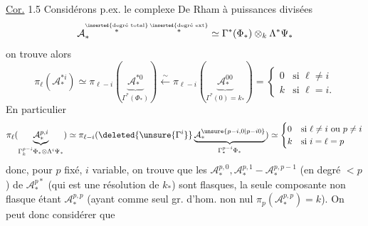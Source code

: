 \uline{Cor.} 1.5
Considérons p.ex. le complexe 
De Rham à puissances divisées
\[
\mathcal A_*^{\overset{\inserted{\text{degré total}}}{*}\,\overset{\inserted{\text{degré ext}}}{*}}
\simeq\Gamma^*(\Phi_*)\otimes_k\Lambda^*\Psi_*
\]
on trouve alors
\[
\pi_\ell(\mathcal A_*^{*i})\simeq
\pi_{\ell-i}(\underbrace{\mathcal A_*^{*0}}_{\Gamma^*(\Phi_*)})
\xleftarrow{\sim}\pi_{\ell-i}(\underbrace{\mathcal A_*^{00}}_{\Gamma^*(0)=k_*})
=\begin{cases}0&\text{si }\ell\ne i\\k&\text{si }\ell=i.\end{cases}
\]
En  particulier
\[
\pi_\ell(\underbrace{\mathcal A_*^{p,i}}_{\Gamma_k^{p-i}\Phi_*\otimes\Lambda^i\Psi_*})
\simeq\pi_{\ell-i}(\deleted{\unsure{\Gamma^i}}
\underbrace{\mathcal A_*^{\unsure{p-i,0|p-i0}}}_{\Gamma_*^{p-i}\Phi_*})
\simeq\begin{cases}0&\text{si }\ell\ne i\text{ ou }p\ne i\\k&\text{si }i=\ell=p\end{cases}
\]
donc, pour $p$ fixé, $i$ variable, on trouve que les 
$\mathcal A_*^{p,0},\mathcal A_*^{p,1}\mathbin{-}\mathcal A_*^{p,p-1}$
 (en degré $<p$) de $\mathcal A_*^{p*}$ 
(qui est une résolution de $k_*$) sont flasques, la seule composante non flasque étant
$\mathcal A_*^{p,p}$ (ayant comme seul gr. d'hom. non nul
$\pi_p(\mathcal A_*^{p,p})=k$). On peut donc considérer que

